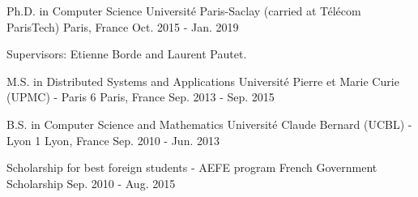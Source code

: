 


\begin{cventries}



\cventry
{Ph.D. in Computer Science} %
{Université Paris-Saclay (carried at Télécom ParisTech)} %
{Paris, France} %
{Oct. 2015 - Jan. 2019} %
{ %
	\begin{cvitems}
	\item Supervisors: Etienne Borde and Laurent Pautet.
	\end{cvitems}
}


\cventry
{M.S. in Distributed Systems and Applications} %
{Université Pierre et Marie Curie (UPMC) - Paris 6} %
{Paris, France} %
{Sep. 2013 - Sep. 2015} %
{ %
}


\cventry
{B.S. in Computer Science and Mathematics} %
{Université Claude Bernard (UCBL) - Lyon 1} %
{Lyon, France} %
{Sep. 2010 - Jun. 2013} %
{ %
}


\cventry
{Scholarship for best foreign students - AEFE program} %
{French Government Scholarship} %
{} %
{Sep. 2010 - Aug. 2015} %
{ %
}


\end{cventries}
